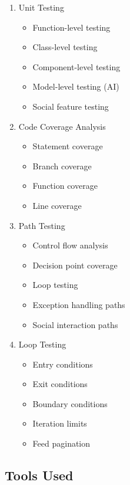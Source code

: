 \begin{enumerate}
    \item Unit Testing
    \begin{itemize}
        \item Function-level testing
        \item Class-level testing
        \item Component-level testing
        \item Model-level testing (AI)
        \item Social feature testing
    \end{itemize}
    
    \item Code Coverage Analysis
    \begin{itemize}
        \item Statement coverage
        \item Branch coverage
        \item Function coverage
        \item Line coverage
    \end{itemize}
    
    \item Path Testing
    \begin{itemize}
        \item Control flow analysis
        \item Decision point coverage
        \item Loop testing
        \item Exception handling paths
        \item Social interaction paths
    \end{itemize}
    
    \item Loop Testing
    \begin{itemize}
        \item Entry conditions
        \item Exit conditions
        \item Boundary conditions
        \item Iteration limits
        \item Feed pagination
    \end{itemize}
\end{enumerate}

\subsection{Tools Used}

